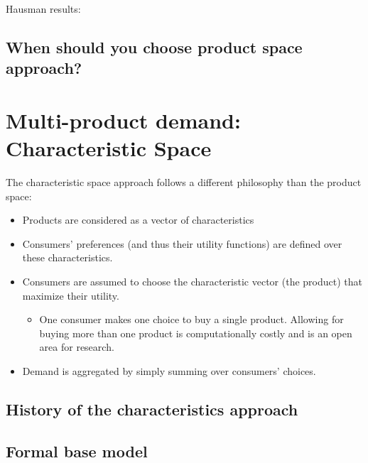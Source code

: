 \documentclass[12pt]{report}
\begin{document}
Hausman results:


\subsection{When should you choose product space approach?}



\section{Multi-product demand: Characteristic Space}

The characteristic space approach follows a different philosophy than the product space:\begin{itemize}
\item Products are considered as a vector of characteristics
\item Consumers' preferences (and thus their utility functions) are defined over these characteristics.
\item Consumers are assumed to choose the characteristic vector (the product) that maximize their utility.
\begin{itemize}
\item One consumer makes one choice to buy a single product. Allowing for buying more than one product is computationally costly and is an open area for research.
\end{itemize}
\item Demand is aggregated by simply summing over consumers' choices.
\end{itemize}

\subsection{History of the characteristics approach}



\subsection{Formal base model}
\end{document}

